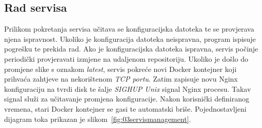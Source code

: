 \subsection{Rad servisa}
Prilikom pokretanja servisa učitava se konfiguracijska datoteka te se provjerava njena ispravnost.
Ukoliko je konfiguracija datoteka neispravna, program ispisuje pogrešku te prekida rad. Ako je
konfiguracijska datoteka ispravna, servis počinje periodički provjeravati izmjene na udaljenom
repositoriju. Ukoliko je došlo do promjene slike s oznakom \textit{latest}, servis pokreće novi
Docker kontejner koji prihvaća zahtjeve na nekorištenom \textit{TCP portu}. Zatim zapisuje novu
Nginx konfiguraciju na tvrdi disk te šalje \textit{SIGHUP Unix} signal Nginx procesu. Takav signal
služi za učitavanje promjena konfiguracije. Nakon korisnički definiranog vremena, stari Docker
kontejner se gasi te automatski briše. Pojednostavljeni dijagram toka prikazan je
slikom~\ref{fig:03servismanagement}.

